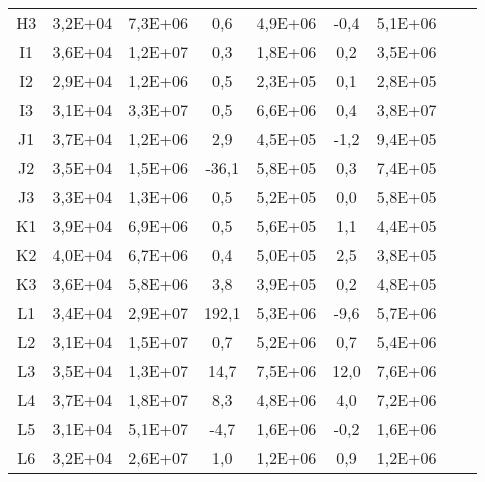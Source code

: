 \begin{center}
\begin{longtable}{ccccccccc}
H3    & 3,2E+04 & 7,3E+06 & 0,6   & 4,9E+06 & -0,4  & 5,1E+06 \\
I1    & 3,6E+04 & 1,2E+07 & 0,3   & 1,8E+06 & 0,2   & 3,5E+06 \\
I2    & 2,9E+04 & 1,2E+06 & 0,5   & 2,3E+05 & 0,1   & 2,8E+05 \\
I3    & 3,1E+04 & 3,3E+07 & 0,5   & 6,6E+06 & 0,4   & 3,8E+07 \\
J1    & 3,7E+04 & 1,2E+06 & 2,9   & 4,5E+05 & -1,2  & 9,4E+05 \\
J2    & 3,5E+04 & 1,5E+06 & -36,1 & 5,8E+05 & 0,3   & 7,4E+05 \\
J3    & 3,3E+04 & 1,3E+06 & 0,5   & 5,2E+05 & 0,0   & 5,8E+05 \\
K1    & 3,9E+04 & 6,9E+06 & 0,5   & 5,6E+05 & 1,1   & 4,4E+05 \\
K2    & 4,0E+04 & 6,7E+06 & 0,4   & 5,0E+05 & 2,5   & 3,8E+05 \\
K3    & 3,6E+04 & 5,8E+06 & 3,8   & 3,9E+05 & 0,2   & 4,8E+05 \\
L1    & 3,4E+04 & 2,9E+07 & 192,1 & 5,3E+06 & -9,6  & 5,7E+06 \\
L2    & 3,1E+04 & 1,5E+07 & 0,7   & 5,2E+06 & 0,7   & 5,4E+06 \\
L3    & 3,5E+04 & 1,3E+07 & 14,7  & 7,5E+06 & 12,0  & 7,6E+06 \\
L4    & 3,7E+04 & 1,8E+07 & 8,3   & 4,8E+06 & 4,0   & 7,2E+06 \\
L5    & 3,1E+04 & 5,1E+07 & -4,7  & 1,6E+06 & -0,2  & 1,6E+06 \\
L6    & 3,2E+04 & 2,6E+07 & 1,0   & 1,2E+06 & 0,9   & 1,2E+06 \\
\end{longtable}
\end{center}

